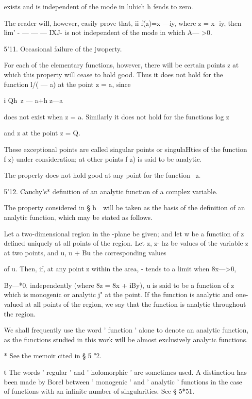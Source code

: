 exists and is independent of the mode in luhich h fends to zero.

The reader will, however, easily prove that, ii f(z)=x —iy, where z =
x- iy, then lim' - — — — IXJ- is not independent of the mode in which
A— >0.

5'11. Occasional failure of the jwoperty.

For each of the elementary functions, however, there will be certain
points z at which this property will cease to hold good. Thus it does
not hold for the function l/( — a) at the point z = a, since

 i Qh\ z — a+h z—a

does not exist when z = a. Similarly it does not hold for the
functions log z

and z at the point z = Q.

These exceptional points are called singular points or singulaHties of
the function f z) under consideration; at other points f z) is said
to be analytic.

The property does not hold good at any point for the function \ z.

5'12. Cauchy's* definition of an analytic function of a complex
variable.

The property considered in § b\ \ will be taken as the basis of the
definition of an analytic function, which may be stated as follows.

Let a two-dimensional region in the -plane be given; and let w be a
function of z defined uniquely at all points of the region. Let z, z-
hz be values of the variable z at two points, and u, u + Bu the
corresponding values

of u. Then, if, at any point z within the area, - tends to a limit
when 8x—>0,

By—*0, independently (where 8z = 8x + iBy), u is said to be a function
of z which is monogenic or analytic j" at the point. If the function
is analytic and one-valued at all points of the region, we say that
the function is analytic throughout the region.

We shall frequently use the word ' function ' alone to denote an
analytic function, as the functions studied in this work will be
almost exclusively analytic functions.

* See the memoir cited in § 5 "2.

t The words ' regular ' and ' holomorphic ' are sometimes used. A
distinctiou has been made by Borel between ' monogenic ' and '
analytic ' functions in the case of functions with an infinite number
of singularities. See § 5*51.

